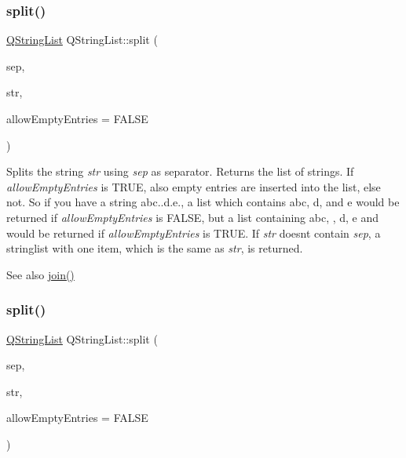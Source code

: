 \subsubsection{\texorpdfstring{split()}{split()}\hspace{0.1cm}{\footnotesize\ttfamily [1/3]}}
{\footnotesize\ttfamily \mbox{\hyperlink{class_q_string_list}{Q\+String\+List}} Q\+String\+List\+::split (\begin{DoxyParamCaption}\item[{const \mbox{\hyperlink{class_q_char}{Q\+Char}} \&}]{sep,  }\item[{const \mbox{\hyperlink{class_q_string}{Q\+String}} \&}]{str,  }\item[{bool}]{allow\+Empty\+Entries = {\ttfamily FALSE} }\end{DoxyParamCaption})\hspace{0.3cm}{\ttfamily [static]}}

Splits the string {\itshape str} using {\itshape sep} as separator. Returns the list of strings. If {\itshape allow\+Empty\+Entries} is T\+R\+UE, also empty entries are inserted into the list, else not. So if you have a string \textquotesingle{}abc..d.\+e.\textquotesingle{}, a list which contains \textquotesingle{}abc\textquotesingle{}, \textquotesingle{}d\textquotesingle{}, and \textquotesingle{}e\textquotesingle{} would be returned if {\itshape allow\+Empty\+Entries} is F\+A\+L\+SE, but a list containing \textquotesingle{}abc\textquotesingle{}, \textquotesingle{}\textquotesingle{}, \textquotesingle{}d\textquotesingle{}, \textquotesingle{}e\textquotesingle{} and \textquotesingle{}\textquotesingle{} would be returned if {\itshape allow\+Empty\+Entries} is T\+R\+UE. If {\itshape str} doesn\textquotesingle{}t contain {\itshape sep}, a stringlist with one item, which is the same as {\itshape str}, is returned.

\begin{DoxySeeAlso}{See also}
\mbox{\hyperlink{class_q_string_list_a4d14f4987725926a5c812991a27d0f91}{join()}} 
\end{DoxySeeAlso}
\mbox{\label{class_q_string_list_a9392a3dfe579b24ee51cd4bd754801e1}} 
\subsubsection{\texorpdfstring{split()}{split()}\hspace{0.1cm}{\footnotesize\ttfamily [2/3]}}
{\footnotesize\ttfamily \mbox{\hyperlink{class_q_string_list}{Q\+String\+List}} Q\+String\+List\+::split (\begin{DoxyParamCaption}\item[{const \mbox{\hyperlink{class_q_reg_exp}{Q\+Reg\+Exp}} \&}]{sep,  }\item[{const \mbox{\hyperlink{class_q_string}{Q\+String}} \&}]{str,  }\item[{bool}]{allow\+Empty\+Entries = {\ttfamily FALSE} }\end{DoxyParamCaption})\hspace{0.3cm}{\ttfamily [static]}}

